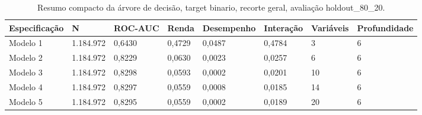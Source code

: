 \begin{table}
\caption{Resumo compacto da árvore de decisão, target binario, recorte geral, avaliação holdout_80_20.}
\label{tab:tabela_compacta_treeClassification_binario_recorte_geral_holdout_80_20}
\begin{tabular}{llllllll}
\toprule
Especificação & N & ROC-AUC & Renda & Desempenho & Interação & Variáveis & Profundidade \\
\midrule
Modelo 1 & 1.184.972 & 0,6430 & 0,4729 & 0,0487 & 0,4784 & 3 & 6 \\
Modelo 2 & 1.184.972 & 0,8229 & 0,0630 & 0,0023 & 0,0257 & 6 & 6 \\
Modelo 3 & 1.184.972 & 0,8298 & 0,0593 & 0,0002 & 0,0201 & 10 & 6 \\
Modelo 4 & 1.184.972 & 0,8297 & 0,0559 & 0,0008 & 0,0185 & 14 & 6 \\
Modelo 5 & 1.184.972 & 0,8295 & 0,0559 & 0,0002 & 0,0189 & 20 & 6 \\
\bottomrule
\end{tabular}
\end{table}
